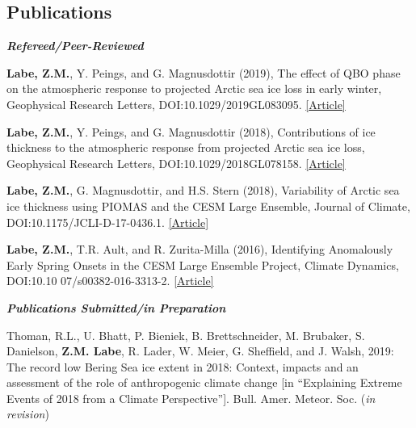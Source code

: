 \documentclass[margin,line,palatino,courier,10pt]{res}
\begin{document}
\begin{resume}
\section{\sc \large{\textcolor{Cerulean}{\textbf{Publications}}}}
\textit{\textbf{Refereed/Peer-Reviewed}}
\vspace*{-0.1in}\\
\begin{etaremune}[leftmargin=0in,topsep=0in,parsep=0in]
\item \textbf{Labe, Z.M.}, Y. Peings, and G. Magnusdottir (2019), The effect of QBO phase on the atmospheric response to projected Arctic sea ice loss in early winter, Geophysical Research Letters, DOI:10.1029/2019GL083095. \href{https://agupubs.onlinelibrary.wiley.com/doi/10.1029/2019GL083095}{[Article]}
\item \textbf{Labe, Z.M.}, Y. Peings, and G. Magnusdottir (2018), Contributions of ice thickness to the atmospheric response from projected Arctic sea ice loss, Geophysical Research Letters, DOI:10.1029/2018GL078158. \href{https://agupubs.onlinelibrary.wiley.com/doi/10.1029/2018GL078158}{[Article]}
\item \textbf{Labe, Z.M.}, G. Magnusdottir, and H.S. Stern (2018), Variability of Arctic sea ice thickness using PIOMAS and the CESM Large Ensemble, Journal of Climate, DOI:10.1175/JCLI-D-17-0436.1. \href{https://journals.ametsoc.org/doi/abs/10.1175/JCLI-D-17-0436.1}{[Article]}
\item \textbf{Labe, Z.M.}, T.R. Ault, and R. Zurita-Milla (2016), Identifying Anomalously Early Spring Onsets in the CESM Large Ensemble Project, Climate Dynamics, DOI:10.10 07/s00382-016-3313-2. \href{http://link.springer.com/article/10.1007/s00382-016-3313-2}{[Article]}
\end{etaremune}

\textit{\textbf{Publications Submitted/in Preparation}}
\vspace*{-0.1in}\\
\begin{etaremune}[leftmargin=0in,topsep=0in,parsep=0in]
\item Thoman, R.L., U. Bhatt, P. Bieniek, B. Brettschneider, M. Brubaker, S. Danielson, \textbf{Z.M. Labe}, R. Lader, W. Meier, G. Sheffield, and J. Walsh, 2019: The record low Bering Sea ice extent in 2018: Context, impacts and an assessment of the role of anthropogenic climate change [in ``Explaining Extreme Events of 2018 from a Climate Perspective'']. Bull. Amer. Meteor. Soc. (\textit{in revision})
\end{etaremune}


\end{resume}
\end{document}
